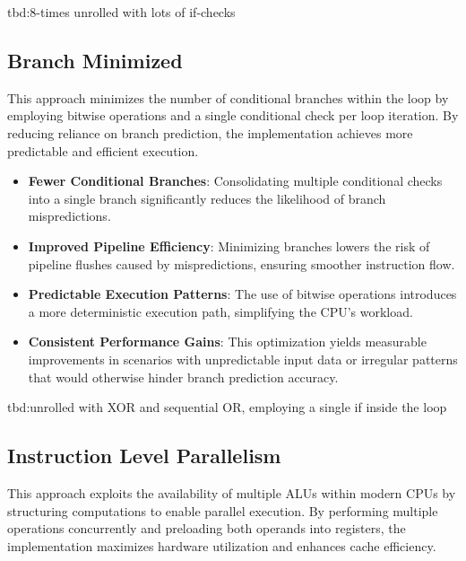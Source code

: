 \documentclass{article}
\begin{document}
tbd:8-times unrolled with lots of if-checks

\subsection{Branch Minimized}

This approach minimizes the number of conditional branches within the loop by employing bitwise operations and a single conditional check per loop iteration. By reducing reliance on branch prediction, the implementation achieves more predictable and efficient execution.

\begin{itemize}
  \item \textbf{Fewer Conditional Branches}: Consolidating multiple conditional checks into a single branch significantly reduces the likelihood of branch mispredictions.
  \item \textbf{Improved Pipeline Efficiency}: Minimizing branches lowers the risk of pipeline flushes caused by mispredictions, ensuring smoother instruction flow.
  \item \textbf{Predictable Execution Patterns}: The use of bitwise operations introduces a more deterministic execution path, simplifying the CPU's workload.
  \item \textbf{Consistent Performance Gains}: This optimization yields measurable improvements in scenarios with unpredictable input data or irregular patterns that would otherwise hinder branch prediction accuracy.
\end{itemize}

tbd:unrolled with XOR and sequential OR, employing a single if inside the loop

\subsection{Instruction Level Parallelism}

This approach exploits the availability of multiple ALUs within modern CPUs by structuring computations to enable parallel execution. By performing multiple operations concurrently and preloading both operands into registers, the implementation maximizes hardware utilization and enhances cache efficiency.
\end{document}
